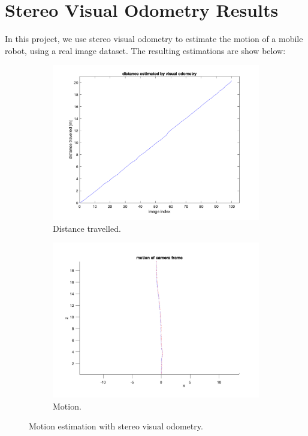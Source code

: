 \documentclass{article} %
\begin{document}
{} %

\section{Stereo Visual Odometry Results} %
In this project, we use stereo visual odometry to estimate the motion of a mobile robot, using a real image dataset. The resulting estimations are show below:

\begin{figure}[hbt]
  \centering
  \begin{subfigure}{.7\textwidth}
    \centering
    \includegraphics[width=1.\linewidth]{ass3_distance}
    \caption{Distance travelled.}
    \label{fig:sub-first}
  \end{subfigure}
  \begin{subfigure}{.7\textwidth}
    \centering
    \includegraphics[width=1.\linewidth]{ass3_motion}
    \caption{Motion.}
    \label{fig:sub-second}
  \end{subfigure}
  \caption{Motion estimation with stereo visual odometry.}
\end{figure}
\end{document}
